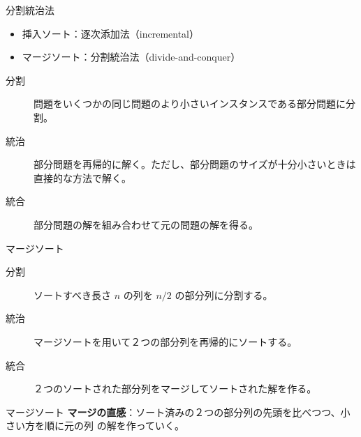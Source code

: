 \documentclass[unicode,11pt,aspectratio=169,hide notes]{beamer} %
\begin{document}
\begin{frame}{分割統治法}
  \begin{itemize}
    \item 挿入ソート：逐次添加法（incremental）
    \item マージソート：分割統治法（divide-and-conquer）
  \end{itemize}
  \begin{description}
    \item[分割] 問題をいくつかの同じ問題のより小さいインスタンスである部分問題に分割。
    \item[統治] 部分問題を再帰的に解く。ただし、部分問題のサイズが十分小さいときは
    直接的な方法で解く。
    \item[統合] 部分問題の解を組み合わせて元の問題の解を得る。
  \end{description}
\end{frame}


\begin{frame}{マージソート}
  \begin{description}
    \item[分割] ソートすべき長さ $n$ の列を $n/2$ の部分列に分割する。
    \item[統治] マージソートを用いて２つの部分列を再帰的にソートする。
    \item[統合] ２つのソートされた部分列をマージしてソートされた解を作る。
  \end{description}
\end{frame}


\begin{frame}{マージソート}
  \textbf{マージの直感}：ソート済みの２つの部分列の先頭を比べつつ、小さい方を順に元の列
  の解を作っていく。
\end{frame}
\end{document}
